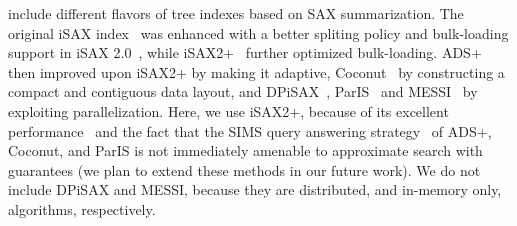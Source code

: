  include different flavors of tree indexes based on SAX summarization. 
The original iSAX index~\cite{conf/kdd/shieh1998} was enhanced with a better spliting policy and bulk-loading support in iSAX 2.0~\cite{conf/icdm/Camerra2010}, while
iSAX2+~\cite{journal/kais/Camerra2014} further optimized bulk-loading. 
ADS+~\cite{journal/vldb/Zoumpatianos2016} then improved upon iSAX2+ by making it adaptive, %
Coconut~\cite{journal/pvldb/kondylakis18,DBLP:conf/sigmod/KondylakisDZP19,coconutjournal} by constructing a compact and contiguous data layout, and DPiSAX~\cite{dpisax,dpisaxjournal}, ParIS~\cite{conf/bigdata/peng18} and MESSI~\cite{conf/icde/peng20} by exploiting parallelization.
Here, we use iSAX2+, because of its excellent performance~\cite{journal/pvldb/echihabi2018} and the fact that the SIMS query answering strategy~\cite{journal/vldb/Zoumpatianos2016} of ADS+, Coconut, and ParIS is not immediately amenable to approximate search with guarantees (we plan to extend these methods in our future work). 
We do not include DPiSAX and MESSI, because they are distributed, and in-memory only, algorithms, respectively. %



